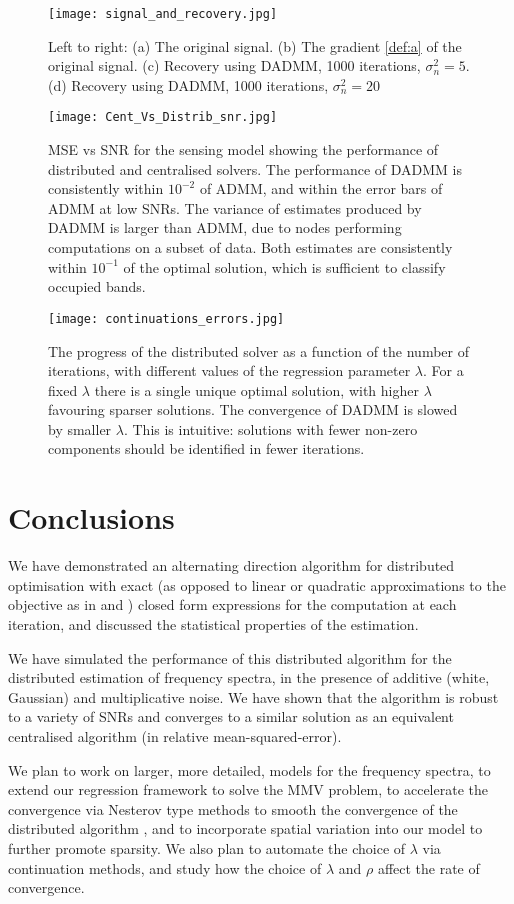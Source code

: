 \begin{figure}[h]
\centering
\texttt{[image: signal\_and\_recovery.jpg]}
\caption{Left to right: (a) The original signal. (b) The gradient \eqref{def:a} of the original signal. (c) Recovery using DADMM, 1000 iterations, \(\sigma^2_n = 5\). (d) Recovery using DADMM, 1000 iterations, \(\sigma^2_n = 20\)  }
\label{different_sigs}
\end{figure}

\begin{figure}[h]
\centering
\texttt{[image: Cent\_Vs\_Distrib\_snr.jpg]}
\caption{MSE vs SNR for the sensing model showing the performance of distributed and centralised solvers. The performance of DADMM is consistently within \(10^{-2}\) of ADMM, and within the error bars of ADMM at low SNRs. The variance of estimates produced by DADMM is larger than ADMM, due to nodes performing computations on a subset of data. Both estimates are consistently within \(10^{-1}\) of the optimal solution, which is sufficient to classify occupied bands.} 
\label{msevssnr0}
\end{figure}

\begin{figure}[h]
\centering
\texttt{[image: continuations\_errors.jpg]}
\caption{The progress of the distributed solver as a function of the number of iterations, with different values of the regression parameter \( \lambda \). For a fixed \( \lambda \) there is a single unique optimal solution, with higher \( \lambda \) favouring sparser solutions. The convergence of DADMM is slowed by smaller \( \lambda \). This is intuitive: solutions with fewer non-zero components should be identified in fewer iterations.}
\label{fig:differentLambda}
\end{figure}

\section{Conclusions}
We have demonstrated an alternating direction algorithm for distributed optimisation with exact (as opposed to linear or quadratic approximations to the objective as in \cite{mokhtari2015dqm} and \cite{ling2015dlm}) closed form expressions for the computation at each iteration, and discussed the statistical properties of the estimation. 

We have simulated the performance of this distributed algorithm for the distributed estimation of frequency spectra, in the presence of additive (white, Gaussian) and multiplicative noise. We have shown that the algorithm is robust to a variety of SNRs and converges to a similar solution as an equivalent centralised algorithm (in relative mean-squared-error).

We plan to work on larger, more detailed, models for the frequency spectra, to extend our regression framework to solve the MMV problem, to accelerate the convergence via Nesterov type methods to smooth the convergence of the distributed algorithm \cite{goldstein2014fast}, and to incorporate spatial variation into our model to further promote sparsity. We also plan to automate the choice of \(\lambda\) via continuation methods, and study how the choice of \(\lambda\) and \(\rho\) affect the rate of convergence. 